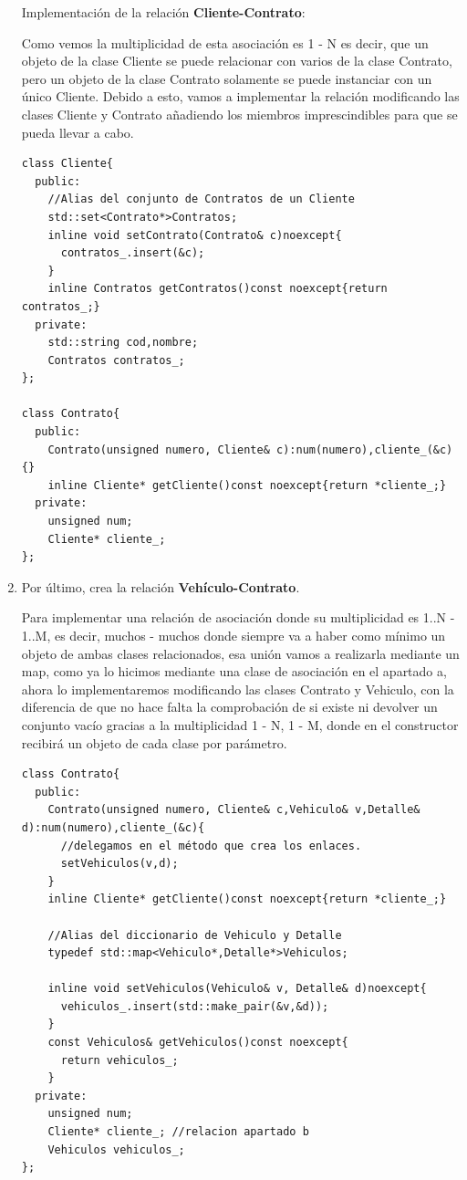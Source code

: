 \begin{enumerate}[label =\alph*)]
  Implementación de la relación \textbf{Cliente-Contrato}:

  Como vemos la multiplicidad de esta asociación es 1 - N es decir, que un objeto de la clase Cliente se puede relacionar con varios de la clase Contrato, pero un objeto de la clase Contrato solamente se puede instanciar con un único Cliente. Debido a esto, vamos a implementar la relación modificando las clases Cliente y Contrato añadiendo los miembros imprescindibles para que se pueda llevar a cabo.
\begin{verbatim}
class Cliente{
  public:
    //Alias del conjunto de Contratos de un Cliente
    std::set<Contrato*>Contratos;
    inline void setContrato(Contrato& c)noexcept{
      contratos_.insert(&c);
    }
    inline Contratos getContratos()const noexcept{return contratos_;}
  private:
    std::string cod,nombre;
    Contratos contratos_;
};

class Contrato{
  public:
    Contrato(unsigned numero, Cliente& c):num(numero),cliente_(&c){}
    inline Cliente* getCliente()const noexcept{return *cliente_;}
  private:
    unsigned num;
    Cliente* cliente_;
};
\end{verbatim}

\item Por último, crea la relación \textbf{Vehículo-Contrato}.
  
  Para implementar una relación de asociación donde su multiplicidad es 1..N - 1..M, es decir, muchos - muchos donde siempre va a haber como mínimo un objeto de ambas clases relacionados, esa unión vamos a realizarla mediante un map, como ya lo hicimos mediante una clase de asociación en el apartado a, ahora lo implementaremos modificando las clases Contrato y Vehiculo, con la diferencia de que no hace falta la comprobación de si existe ni devolver un conjunto vacío gracias a la multiplicidad 1 - N, 1 - M, donde en el constructor recibirá un objeto de cada clase por parámetro.
\begin{verbatim}
class Contrato{
  public:
    Contrato(unsigned numero, Cliente& c,Vehiculo& v,Detalle& d):num(numero),cliente_(&c){
      //delegamos en el método que crea los enlaces.
      setVehiculos(v,d);
    }
    inline Cliente* getCliente()const noexcept{return *cliente_;}

    //Alias del diccionario de Vehiculo y Detalle
    typedef std::map<Vehiculo*,Detalle*>Vehiculos;

    inline void setVehiculos(Vehiculo& v, Detalle& d)noexcept{
      vehiculos_.insert(std::make_pair(&v,&d));
    }
    const Vehiculos& getVehiculos()const noexcept{
      return vehiculos_;
    }
  private:
    unsigned num;
    Cliente* cliente_; //relacion apartado b
    Vehiculos vehiculos_;
};


\end{verbatim}
\end{enumerate}
